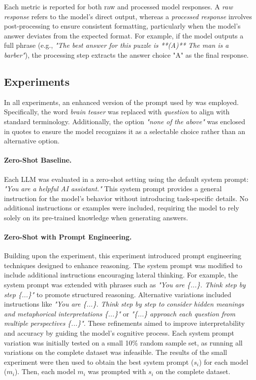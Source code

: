 Each metric is reported for both raw and processed model responses. A \textit{raw response} refers to the model's direct output, whereas a \textit{processed response} involves post-processing to ensure consistent formatting, particularly when the model's answer deviates from the expected format. For example, if the model outputs a full phrase (e.g., \textit{"The best answer for this puzzle is **(A)** The man is a barber"}), the processing step extracts the answer choice "A" as the final response.

\subsection{Experiments}

In all experiments, an enhanced version of the prompt used by \textcite{jiangBRAINTEASERLateralThinking2023} was employed. Specifically, the word \textit{brain teaser} was replaced with \textit{question} to align with standard terminology. Additionally, the option \textit{"none of the above"} was enclosed in quotes to ensure the model recognizes it as a selectable choice rather than an alternative option.

\paragraph{Zero-Shot Baseline.}
\label{zero-shot-prompt}
Each \ac{LLM} was evaluated in a zero-shot setting using the default system prompt: \textit{"You are a helpful AI assistant."} This system prompt provides a general instruction for the model's behavior without introducing task-specific details. No additional instructions or examples were included, requiring the model to rely solely on its pre-trained knowledge when generating answers.

\paragraph{Zero-Shot with Prompt Engineering.}
\label{zero-shot-prompt-engineering}
Building upon the  experiment, this experiment introduced prompt engineering techniques designed to enhance reasoning. The system prompt was modified to include additional instructions encouraging lateral thinking. For example, the system prompt was extended with phrases such as \textit{"You are \{...\}. Think step by step \{...\}"} to promote structured reasoning. Alternative variations included instructions like \textit{"You are \{...\}. Think step by step to consider hidden meanings and metaphorical interpretations \{...\}"} or \textit{"\{...\} approach each question from multiple perspectives \{...\}"}. These refinements aimed to improve interpretability and accuracy by guiding the model's cognitive process. Each system prompt variation was initially tested on a small 10\% random sample set, as running all variations on the complete dataset was infeasible. The results of the small experiment were then used to obtain the best system prompt ($s_i$) for each model ($m_i$). Then, each model $m_i$ was prompted with $s_i$ on the complete dataset.

